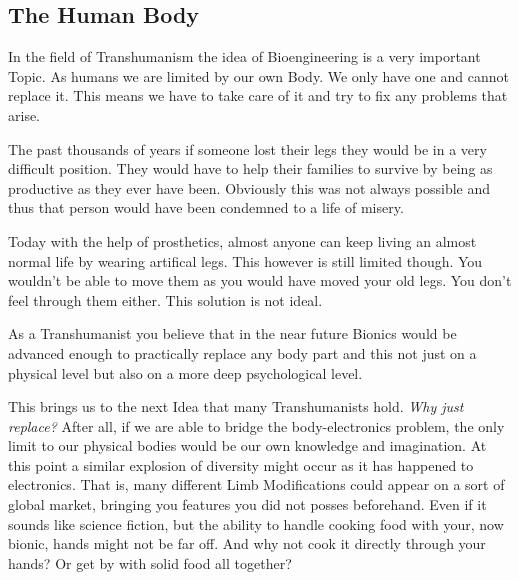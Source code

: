 \documentclass[
      12pt,
      a4paper,
      cleardoublepage=empty,
      final,
      twoside
        ]{scrbook}
\begin{document}
    \subsection{The Human Body}
      \begin{par}
        In the field of Transhumanism the idea of Bioengineering is a very important Topic. 
        As humans we are limited by our own Body. 
        We only have one and cannot replace it. 
        This means we have to take care of it and try to fix any problems that arise. 
      \end{par}
      \begin{par}
        The past thousands of years if someone lost their legs they would be in a very difficult position. 
        They would have to help their families to survive by being as productive as they ever have been. 
        Obviously this was not always possible and thus that person would have been condemned to a life of misery.
      \end{par}
      \begin{par}
        Today with the help of prosthetics, almost anyone can keep living an almost normal life by wearing artifical legs. 
        This however is still limited though. 
        You wouldn't be able to move them as you would have moved your old legs. 
        You don't feel through them either. 
        This solution is not ideal.
      \end{par}
      \begin{par}
        As a Transhumanist you believe that in the near future Bionics would be advanced enough to practically replace any body part and this not just on a physical level but also on a more deep psychological level.
      \end{par}
      \begin{par}
        This brings us to the next Idea that many Transhumanists hold. \emph{Why just replace?} 
        After all, if we are able to bridge the body-electronics problem, the only limit to our physical bodies would be our own knowledge and imagination. 
        At this point a similar explosion of diversity might occur as it has happened to electronics. 
        That is, many different Limb Modifications could appear on a sort of global market, bringing you features you did not posses beforehand. 
        Even if it sounds like science fiction, but the ability to handle cooking food with your, now bionic, hands might not be far off. 
        And why not cook it directly through your hands? Or get by with solid food all together?
      \end{par}
\end{document}
